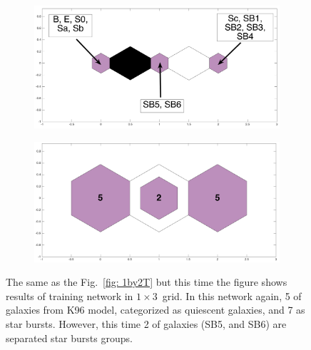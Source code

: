             \begin{figure}
                \begin{subfigure}[b]{0.5\textwidth}
                    \centering
                    \includegraphics[width=\textwidth]{../images0.01/1d/dist_1_by_3.png}
                \end{subfigure}
                \hfill
                \begin{subfigure}[b]{0.5\textwidth}
                     \includegraphics[width=\textwidth]{../images0.01/1d/hit_t_1_by_3.png}
                \end{subfigure}
                \caption{The same as the Fig.~\ref{fig: 1by2T} but this time the figure shows results of training network in $1\times3$~grid. In this network again, 5 of galaxies from K96 model, categorized as quiescent galaxies, and 7 as star bursts. However, this time 2 of galaxies (SB5, and SB6) are separated star bursts groups.}
                 \label{fig: 1by3T}
            \end{figure}
           
